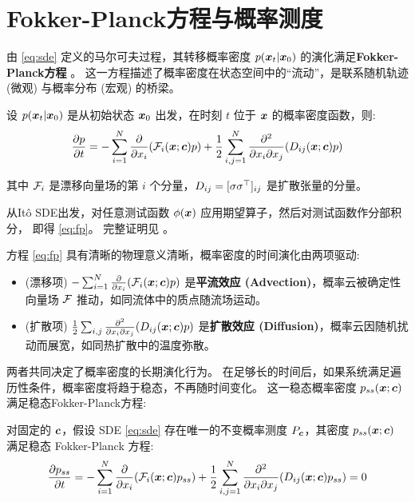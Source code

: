 \section{Fokker-Planck方程与概率测度}
\label{sec:sde_measure}

由 \eqref{eq:sde} 定义的马尔可夫过程，其转移概率密度 $p(\bm{x}_t | \bm{x}_0)$ 的演化满足\textbf{Fokker-Planck方程} \cite{gardiner2009stochastic}。
这一方程描述了概率密度在状态空间中的“流动”，是联系随机轨迹 (微观) 与概率分布 (宏观) 的桥梁。

\begin{theorem}
\label{thm:fp}
    设 $p(\bm{x}_t | \bm{x}_0)$ 是从初始状态 $\bm{x}_0$ 出发，在时刻 $t$ 位于 $\bm{x}$ 的概率密度函数，则:
    \begin{equation}
    \label{eq:fp}
        \frac{\partial p}{\partial t} = -\sum_{i=1}^N \frac{\partial}{\partial x_i}(\mathcal{F}_i(\bm{x}; \bm{c}) p) + \frac{1}{2}\sum_{i,j=1}^N \frac{\partial^2}{\partial x_i \partial x_j}(D_{ij}(\bm{x}; \bm{c}) p)
    \end{equation}

    其中 $\mathcal{F}_i$ 是漂移向量场的第 $i$ 个分量，$D_{ij} = [\sigma\sigma^\top]_{ij}$ 是扩散张量的分量。
\end{theorem}

从Itô SDE出发，对任意测试函数 $\phi(\bm{x})$ 应用期望算子，然后对测试函数作分部积分，
即得 \eqref{eq:fp}。
完整证明见 \cite{pavliotis2014stochastic}。

方程 \eqref{eq:fp} 具有清晰的物理意义清晰，概率密度的时间演化由两项驱动:
\begin{itemize}
    \item (漂移项) $-\sum_{i=1}^N \frac{\partial}{\partial x_i}(\mathcal{F}_i(\bm{x}; \bm{c}) p)$ 是\textbf{平流效应 (Advection)}，概率云被确定性向量场 $\mathcal{F}$ 推动，如同流体中的质点随流场运动。
    \item (扩散项) $\frac{1}{2}\sum_{i,j} \frac{\partial^2}{\partial x_i \partial x_j}(D_{ij}(\bm{x}; \bm{c}) p)$ 是\textbf{扩散效应 (Diffusion)}，概率云因随机扰动而展宽，如同热扩散中的温度弥散。
\end{itemize}

两者共同决定了概率密度的长期演化行为。
在足够长的时间后，如果系统满足遍历性条件，概率密度将趋于稳态，不再随时间变化。
这一稳态概率密度 $p_{ss}(\bm{x}; \bm{c})$ 满足稳态Fokker-Planck方程:

\begin{assumption}[稳态测度的存在性]
\label{ass:stationary_measure}
    对固定的 $\bm{c}$，假设 SDE \eqref{eq:sde} 存在唯一的不变概率测度 $P_{\bm{c}}$，其密度 $p_{ss}(\bm{x}; \bm{c})$ 满足稳态 Fokker-Planck 方程:
    \begin{equation}
    \label{eq:steady_fp}
        \frac{\partial p_{ss}}{\partial t} = -\sum_{i=1}^N \frac{\partial}{\partial x_i}(\mathcal{F}_i(\bm{x}; \bm{c}) p_{ss}) + \frac{1}{2}\sum_{i,j=1}^N \frac{\partial^2}{\partial x_i \partial x_j}(D_{ij}(\bm{x}; \bm{c}) p_{ss}) = 0
    \end{equation}
\end{assumption}

